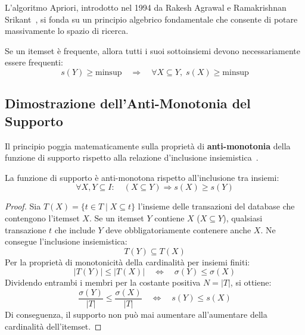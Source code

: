 L'algoritmo Apriori, introdotto nel 1994 da Rakesh Agrawal e Ramakrishnan Srikant~\cite{agrawal1994}, si fonda su un principio algebrico fondamentale che consente di potare massivamente lo spazio di ricerca.

\begin{theorem}
\label{thm:dm-apriori-principle}
Se un itemset è frequente, allora tutti i suoi sottoinsiemi devono necessariamente essere frequenti:
\begin{equation}
\label{eq:dm-apriori-forward}
s(Y) \ge \mathrm{minsup} \quad \Longrightarrow \quad \forall X \subseteq Y, \; s(X) \ge \mathrm{minsup}
\end{equation}
\end{theorem}

\FloatBarrier
\subsection{Dimostrazione dell'Anti-Monotonia del Supporto}
Il principio poggia matematicamente sulla proprietà di \textbf{anti-monotonia} della funzione di supporto rispetto alla relazione d'inclusione insiemistica~\cite{tan2018}.

\begin{theorem}
La funzione di supporto è anti-monotona rispetto all'inclusione tra insiemi:
\begin{equation}
\label{eq:dm-anti-monotonicity}
\forall X, Y \subseteq I : \quad (X \subseteq Y) \Longrightarrow s(X) \ge s(Y)
\end{equation}
\end{theorem}

\begin{proof}
Sia $T(X) = \{ t \in T \mid X \subseteq t \}$ l'insieme delle transazioni del database che contengono l'itemset $X$.
Se un itemset $Y$ contiene $X$ ($X \subseteq Y$), qualsiasi transazione $t$ che include $Y$ deve obbligatoriamente contenere anche $X$. Ne consegue l'inclusione insiemistica:
\begin{equation}
T(Y) \subseteq T(X)
\end{equation}
Per la proprietà di monotonicità della cardinalità per insiemi finiti:
\begin{equation}
|T(Y)| \le |T(X)| \quad \Longleftrightarrow \quad \sigma(Y) \le \sigma(X)
\end{equation}
Dividendo entrambi i membri per la costante positiva $N = |T|$, si ottiene:
\begin{equation}
\frac{\sigma(Y)}{|T|} \le \frac{\sigma(X)}{|T|} \quad \Longleftrightarrow \quad s(Y) \le s(X)
\end{equation}
Di conseguenza, il supporto non può mai aumentare all'aumentare della cardinalità dell'itemset.
\end{proof}

